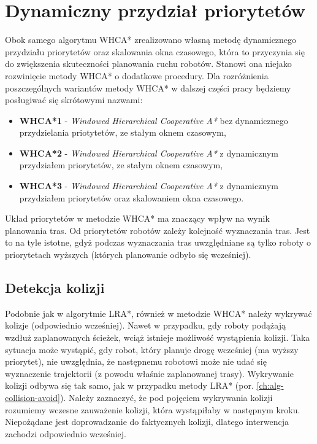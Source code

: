 \section{Dynamiczny przydział priorytetów}
\label{ch:alg-priorities-allocation}
Obok samego algorytmu WHCA* zrealizowano własną metodę dynamicznego przydziału priorytetów oraz skalowania okna czasowego, która to przyczynia się do zwiększenia skuteczności planowania ruchu robotów. Stanowi ona niejako rozwinięcie metody WHCA* o dodatkowe procedury.
Dla rozróżnienia poszczególnych wariantów metody WHCA* w dalszej części pracy będziemy posługiwać się skrótowymi nazwami:
\begin{itemize}
	\item {\bf WHCA*1} - {\it Windowed Hierarchical Cooperative A*} bez dynamicznego przydzielania priotytetów, ze stałym oknem czasowym,
	\item {\bf WHCA*2} - {\it Windowed Hierarchical Cooperative A*} z dynamicznym przydziałem priorytetów, ze stałym oknem czasowym,
	\item {\bf WHCA*3} - {\it Windowed Hierarchical Cooperative A*} z dynamicznym przydziałem priorytetów oraz skalowaniem okna czasowego.
\end{itemize}

Układ priorytetów w metodzie WHCA* ma znaczący wpływ na wynik planowania tras. Od priorytetów robotów zależy kolejność wyznaczania tras.
Jest to na tyle istotne, gdyż podczas wyznaczania tras uwzględniane są tylko roboty o priorytetach wyższych (których planowanie odbyło się wcześniej).

\subsection{Detekcja kolizji}
Podobnie jak w algorytmie LRA*, również w metodzie WHCA* należy wykrywać kolizje (odpowiednio wcześniej).
Nawet w przypadku, gdy roboty podążają wzdłuż zaplanowanych ścieżek, wciąż istnieje możliwość wystąpienia kolizji.
Taka sytuacja może wystąpić, gdy robot, który planuje drogę wcześniej (ma wyższy priorytet), nie uwzględnia, że następnemu robotowi może nie udać się wyznaczenie trajektorii (z powodu właśnie zaplanowanej trasy).
Wykrywanie kolizji odbywa się tak samo, jak w przypadku metody LRA* (por. \ref{ch:alg-collision-avoid}).
Należy zaznaczyć, że pod pojęciem wykrywania kolizji rozumiemy wczesne zauważenie kolizji, która wystąpiłaby w następnym kroku. Niepożądane jest doprowadzanie do faktycznych kolizji, dlatego interwencja zachodzi odpowiednio wcześniej.

